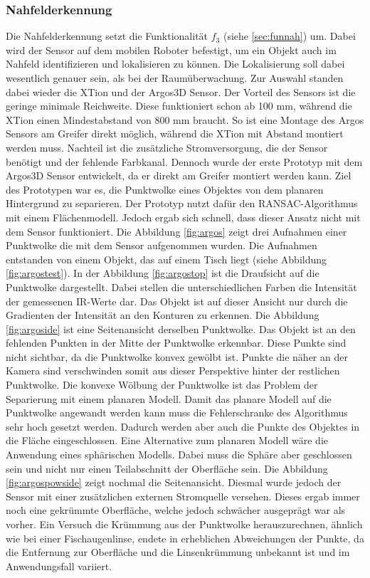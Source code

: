 \subsubsection{Nahfelderkennung}
Die Nahfelderkennung setzt die Funktionalität $f_3$ (siehe \ref{sec:funnah}) um. Dabei wird der Sensor auf dem mobilen Roboter befestigt, um ein Objekt auch im Nahfeld identifizieren und lokalisieren zu können. Die Lokalisierung soll dabei wesentlich genauer sein, als bei der Raumüberwachung. Zur Auswahl standen dabei wieder die XTion und der Argos3D Sensor. Der Vorteil des Sensors ist die geringe minimale Reichweite. Diese funktioniert schon ab 100 mm, während die XTion einen Mindestabstand von 800 mm braucht. So ist eine Montage des Argos Sensors am Greifer direkt möglich, während die XTion mit Abstand montiert werden muss. Nachteil ist die zusätzliche Stromversorgung, die der Sensor benötigt und der fehlende Farbkanal. Dennoch wurde der erste Prototyp mit dem Argos3D Sensor entwickelt, da er direkt am Greifer montiert werden kann. Ziel des Prototypen war es, die Punktwolke eines Objektes von dem planaren Hintergrund zu separieren. Der Prototyp nutzt dafür den RANSAC-Algorithmus mit einem Flächenmodell. Jedoch ergab sich schnell, dass dieser Ansatz nicht mit dem Sensor funktioniert. Die Abbildung \ref{fig:argos} zeigt drei Aufnahmen einer Punktwolke die mit dem Sensor aufgenommen wurden. Die Aufnahmen entstanden von einem Objekt, das auf einem Tisch liegt (siehe Abbildung \ref{fig:argostest}). In der Abbildung \ref{fig:argostop} ist die Draufsicht auf die Punktwolke dargestellt. Dabei stellen die unterschiedlichen Farben die Intensität der gemessenen IR-Werte dar. Das Objekt ist auf dieser Ansicht nur durch die Gradienten der Intensität an den Konturen zu erkennen. Die Abbildung \ref{fig:argoside} ist eine Seitenansicht derselben Punktwolke. Das Objekt ist an den fehlenden Punkten in der Mitte der Punktwolke erkennbar. Diese Punkte sind nicht sichtbar, da die Punktwolke konvex gewölbt ist. Punkte die näher an der Kamera sind verschwinden somit aus dieser Perspektive hinter der restlichen Punktwolke. Die konvexe Wölbung der Punktwolke ist das Problem der Separierung mit einem planaren Modell. Damit das planare Modell auf die Punktwolke angewandt werden kann muss die Fehlerschranke des Algorithmus sehr hoch gesetzt werden. Dadurch werden aber auch die Punkte des Objektes in die Fläche eingeschlossen. Eine Alternative zum planaren Modell wäre die Anwendung eines sphärischen Modells. Dabei muss die Sphäre aber geschlossen sein und nicht nur einen Teilabschnitt der Oberfläche sein.  Die Abbildung \ref{fig:argospowside} zeigt nochmal die Seitenansicht. Diesmal wurde jedoch der Sensor mit einer zusätzlichen externen Stromquelle versehen. Dieses ergab immer noch eine gekrümmte Oberfläche, welche jedoch schwächer ausgeprägt war als vorher. Ein Versuch die Krümmung aus der Punktwolke herauszurechnen, ähnlich wie bei einer Fischaugenlinse, endete in erheblichen Abweichungen der Punkte, da die Entfernung zur Oberfläche und die Linsenkrümmung unbekannt ist und im Anwendungsfall variiert.

